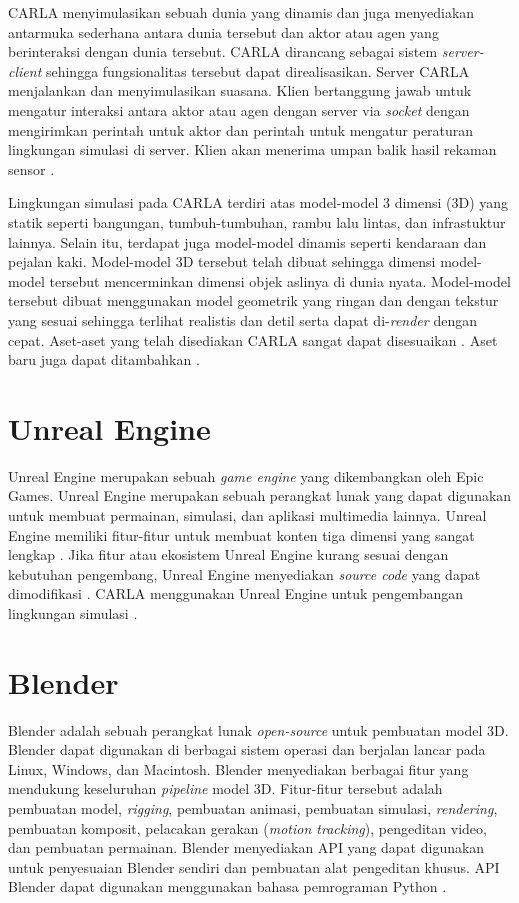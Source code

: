 CARLA menyimulasikan sebuah dunia yang dinamis dan juga menyediakan antarmuka
sederhana antara dunia tersebut dan aktor atau agen yang berinteraksi dengan
dunia tersebut. CARLA dirancang sebagai sistem \textit{server-client} sehingga
fungsionalitas tersebut dapat direalisasikan. Server CARLA menjalankan dan
menyimulasikan suasana. Klien bertanggung jawab untuk mengatur interaksi antara
aktor atau agen dengan server via \textit{socket} dengan mengirimkan perintah
untuk aktor dan perintah untuk mengatur peraturan lingkungan simulasi di server.
Klien akan menerima umpan balik hasil rekaman sensor
\parencite{carla-dosovitskiy}.

Lingkungan simulasi pada CARLA terdiri atas model-model 3 dimensi (3D) yang
statik seperti bangungan, tumbuh-tumbuhan, rambu lalu lintas, dan infrastuktur
lainnya. Selain itu, terdapat juga model-model dinamis seperti kendaraan dan
pejalan kaki. Model-model 3D tersebut telah dibuat sehingga dimensi model-model
tersebut mencerminkan dimensi objek aslinya di dunia nyata. Model-model tersebut
dibuat menggunakan model geometrik yang ringan dan dengan tekstur yang sesuai
sehingga terlihat realistis dan detil serta dapat di-\textit{render} dengan
cepat. Aset-aset yang telah disediakan CARLA sangat dapat disesuaikan
\parencite{carla-dosovitskiy}. Aset baru juga dapat ditambahkan
\parencite{carla-documentation-intro}.


\section{Unreal Engine}
Unreal Engine merupakan sebuah \textit{game engine} yang dikembangkan oleh Epic
Games. Unreal Engine merupakan sebuah perangkat lunak yang dapat digunakan untuk
membuat permainan, simulasi, dan aplikasi multimedia lainnya. Unreal Engine
memiliki fitur-fitur untuk membuat konten tiga dimensi yang sangat lengkap
\parencite{ue-5}. Jika fitur atau ekosistem Unreal Engine kurang sesuai dengan
kebutuhan pengembang, Unreal Engine menyediakan \textit{source code} yang dapat
dimodifikasi \parencite{ue-4}. CARLA menggunakan Unreal Engine untuk
pengembangan lingkungan simulasi \parencite{carla-documentation-build}.

\section{Blender}
Blender adalah sebuah perangkat lunak \textit{open-source} untuk pembuatan model
3D. Blender dapat digunakan di berbagai sistem operasi dan berjalan lancar pada
Linux, Windows, dan Macintosh. Blender menyediakan berbagai fitur yang mendukung
keseluruhan \textit{pipeline} model 3D. Fitur-fitur tersebut adalah pembuatan
model, \textit{rigging}, pembuatan animasi, pembuatan simulasi,
\textit{rendering}, pembuatan komposit, pelacakan gerakan (\textit{motion
tracking}), pengeditan video, dan pembuatan permainan. Blender menyediakan API
yang dapat digunakan untuk penyesuaian Blender sendiri dan pembuatan alat
pengeditan khusus. API Blender dapat digunakan menggunakan bahasa pemrograman
Python \parencite{blender-about}.

